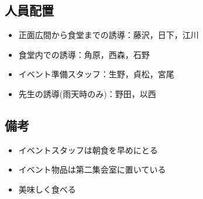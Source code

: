 \subsection{人員配置}
\begin{itemize}
\item 正面広間から食堂までの誘導：藤沢，日下，江川
\item 食堂内での誘導：角原，西森，石野
\item イベント準備スタッフ：生野，貞松，宮尾
  \item 先生の誘導(雨天時のみ)：野田，以西
\end{itemize}



\subsection{備考}
\begin{itemize}
\item イベントスタッフは朝食を早めにとる
\item イベント物品は第二集会室に置いている
\item 美味しく食べる


\end{itemize}

%

